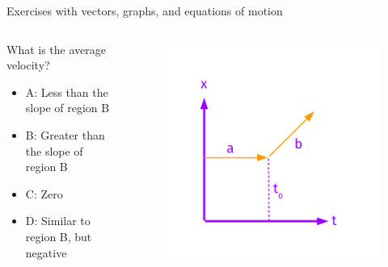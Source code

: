 \documentclass{beamer}
\begin{document}
\begin{frame}{Exercises with vectors, graphs, and equations of motion}
\begin{columns}[T]
\begin{column}{0.4\textwidth}
\small
What is the average velocity?
\begin{itemize}
\item A: Less than the slope of region B
\item B: Greater than the slope of region B
\item C: Zero
\item D: Similar to region B, but negative
\end{itemize}
\end{column}
\begin{column}{0.6\textwidth}
\begin{figure}
\centering
\includegraphics[width=\textwidth,trim=0cm 0cm 0cm 1.5cm,clip=true]{figures/Vectors3.pdf}
\end{figure}
\end{column}
\end{columns}
\end{frame}
\end{document}
